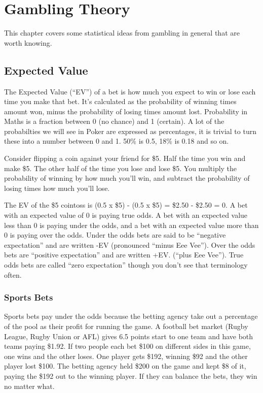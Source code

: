 \chapter{Gambling Theory}


This chapter covers some statistical ideas from gambling in general that 
are worth knowing.

\section{Expected Value}

The Expected Value (``EV'') of a bet is how much you expect to win or lose
each time you make that bet. It's calculated as the probability of
winning times amount won, minus the probability of losing times amount
lost. Probability in Maths is a fraction between 0 (no chance)
and 1 (certain). A lot of the probabilties we will see in Poker
are expressed as percentages, it is trivial to turn these into a number
between 0 and 1. 50\% is 0.5, 18\% is 0.18 and so on.

Consider flipping a coin against your friend
for \$5. Half the time you win and make \$5. The other half of the
time you lose and lose \$5. You multiply the probability of winning
by how much you'll win, and subtract the probability of losing times
how much you'll lose.

The EV of the \$5 cointoss is (0.5 x \$5) - (0.5 x \$5) 
= \$2.50 - \$2.50 = 0. A bet with an expected value of 0 is 
paying true odds. A bet with an expected value less than 0 is
paying under the odds, and a bet with an expected value more than
0 is paying over the odds. Under the odds bets are said to be
``negative expectation'' and are written -EV (pronounced ``minus Eee Vee'').
Over the odds bets are ``positive expectation'' and are written +EV. 
(``plus Eee Vee''). True odds bets are called ``zero expectation'' 
though you don't see that terminology often.

\subsection*{Sports Bets}
Sports bets pay under the odds because the betting agency take out a percentage
of the pool as their profit for running the game. A football bet market 
(Rugby League, Rugby Union or AFL) gives 6.5 points start 
to one team and have both teams paying \$1.92. If two people each bet \$100 on
different sides in this game, one wins and the other loses. One 
player gets \$192, winning \$92 and the other player lost \$100. The 
betting agency held \$200 on the game and kept \$8 of it, paying
the \$192 out to the winning player. If they can balance the bets, 
they win no matter what.

